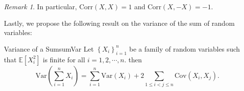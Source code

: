 \documentclass[math, code]{amznotes}
\theoremstyle{remark}
\newtheorem*{remark}{Remark}
\begin{document}
\begin{notebox}
    \begin{remark}
        In particular, $\mathrm{Corr}\left(X, X\right) = 1$ and $\mathrm{Corr}\left(X, -X\right) = -1$.
    \end{remark}
\end{notebox}
Lastly, we propose the following result on the variance of the sum of random variables:
\begin{probox}{Variance of a Sum}{sumVar}
    Let $\left\{X_i\right\}_{i = 1}^n$ be a family of random variables such that $\mathbb{E}\left[X_i^2\right]$ is finite for all $i = 1, 2, \cdots, n$. then 
    \begin{equation*}
        \mathrm{Var}\left(\sum_{i = 1}^{n}X_i\right) = \sum_{i = 1}^{n}\mathrm{Var}\left(X_i\right) + 2\sum_{1 \leq i < j \leq n}\mathrm{Cov}\left(X_i, X_j\right).
    \end{equation*}
\end{probox}
\end{document}

